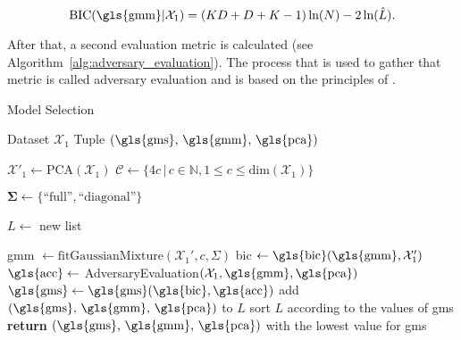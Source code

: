 \documentclass[../../main.tex]{subfiles}
\begin{document}
 \begin{equation}
     \text{BIC}(\text{\gls{gmm}}|\mathcal{X}_1) = (KD+D+K-1) \, \text{ln}(N) - 2 \, \text{ln}(\hat{L}).
 \end{equation}

 After that, a second evaluation metric is calculated (see Algorithm~\ref{alg:adversary_evaluation}). The process that is used to gather that metric is called adversary evaluation and is based on the principles of .
 


\begin{algorithm}
    \caption{Model Selection}
    \label{alg:model_selection}
 
    \begin{algorithmic}[1]
        \REQUIRE Dataset $\mathcal{X}_1$
        \ENSURE Tuple $(\text{\gls{gms}, \gls{gmm}, \gls{pca}})$

        \STATE $\mathcal{X}'_1 \leftarrow \text{PCA}(\mathcal{X}_1)$
        \STATE $\mathcal{C} \leftarrow \{ 4c \, | \,  c\in \mathbb{N}, 1 \leq c \leq \text{dim}(\mathcal{X}_1) \}$
        
        \STATE $\bm{\Sigma} \leftarrow \{\text{``full''}, \text{``diagonal''}\}$

        \STATE $L \leftarrow$ new list

                \STATE \gls{gmm} $\leftarrow \text{fitGaussianMixture}(\mathcal{X}_1', c, \Sigma)$
                \STATE \gls{bic} $\leftarrow \text{\gls{bic}}(\text{\gls{gmm}}, \mathcal{X}_1')$
                \STATE $\text{\gls{acc}} \leftarrow$ AdversaryEvaluation$(\mathcal{X}_1, \text{\gls{gmm}}, \text{\gls{pca}})$
                \STATE $\text{\gls{gms}} \leftarrow \text{\gls{gms}}(\text{\gls{bic}}, \text{\gls{acc}})$
                \STATE add $(\text{\gls{gms}, \gls{gmm}, \gls{pca}})$ to $L$
            \ENDFOR
        \ENDFOR
        \STATE sort $L$ according to the values of \gls{gms} 
        \STATE \textbf{return} $(\text{\gls{gms}, \gls{gmm}, \gls{pca}})$ with the lowest value for \gls{gms}
    \end{algorithmic}
 \end{algorithm}
\end{document}
